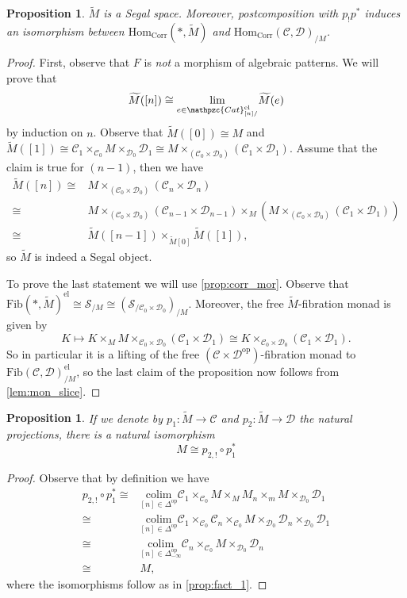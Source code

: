 \documentclass[a4paper, reqno]{amsart}
\newtheorem{prop}[theorem]{Proposition}
\theoremstyle{definition}
\newcommand\cC{\mathscr C}
\newcommand\cD{\mathscr D}
\newcommand\cS{\mathscr S}
\newcommand\mor{\mathrm{Hom}}
\newcommand\op{\mathrm{op}}
\newcommand\colim{\mathrm{colim}}
\newcommand\fib{\mathrm{Fib}}
\newcommand\el{\mathrm{el}}
\newcommand{\mElo}[2]{\mathpzc{#1}^{\mathrm{el}}_{#2/}}
\begin{document}
\begin{prop}\label{prop:rfib}
$\widetilde{M}$ is a Segal space. Moreover, postcomposition with $p_!p^*$ induces an isomorphism between $\mor_{\mathrm{Corr}}(*, \widetilde{M})$ and $\mor_{\mathrm{Corr}}(\cC, \cD)_{/M}$.
\end{prop}
\begin{proof}
First, observe that $F$ is \textit{not} a morphism of algebraic patterns. We will prove that 
\[\widetilde{M}([n])\cong\underset{e\in\mElo{Cat}{[n]}}{\lim}\widetilde{M}(e)\]
by induction on $n$. Observe that $\widetilde{M}([0])\cong M$ and $\widetilde{M}([1])\cong \cC_1\times_{\cC_0}M\times_{\cD_0}\cD_1\cong M\times_{(\cC_0\times \cD_0)}(\cC_1\times\cD_1)$. Assume that the claim is true for $(n-1)$, then we have 
\begin{equation*}
    \begin{split}
        \widetilde{M}([n])\cong& M\times_{(\cC_0\times\cD_0)}(\cC_n\times\cD_n)\\
        \cong&  M\times_{(\cC_0\times\cD_0)}(\cC_{n-1}\times\cD_{n-1})\times_M(M\times_{(\cC_0\times\cD_0)}(\cC_1\times\cD_1))\\
        \cong&\widetilde{M}([n-1])\times_{\widetilde{M}[0]}\widetilde{M}([1]),
    \end{split}
\end{equation*}
so $\widetilde{M}$ is indeed a Segal object.\par
To prove the last statement we will use \cref{prop:corr_mor}. Observe that $\fib(*,\widetilde{M})^\el\cong\cS_{/M}\cong (\cS_{/\cC_0\times \cD_0})_{/M}$. Moreover, the free $\widetilde{M}$-fibration monad is given by 
\[K\mapsto K\times_M M\times_{\cC_0\times \cD_0} (\cC_1\times \cD_1)\cong K\times_{\cC_0\times \cD_0} (\cC_1\times \cD_1).\] 
So in particular it is a lifting of the free $(\cC\times\cD^\op)$-fibration monad to $\fib(\cC,\cD)_{/M}^\el$, so the last claim of the proposition now follows from \cref{lem:mon_slice}.
\end{proof}
\begin{prop}
If we denote by $p_1:\widetilde{M}\rightarrow\cC$ and $p_2:\widetilde{M}\rightarrow\cD$ the natural projections, there is a natural isomorphism
\[M\cong p_{2,!}\circ p_1^*\]
\end{prop}
\begin{proof}
Observe that by definition we have
\begin{equation*}
    \begin{split}
        p_{2,!}\circ p_1^*\cong &\underset{[n]\in\Delta^\op}{\colim}\cC_1\times_{\cC_0} M\times_M M_n\times_m M\times_{\cD_0} \cD_1\\
        \cong &\underset{[n]\in\Delta^\op}{\colim} \cC_1\times_{\cC_0}\cC_n\times_{\cC_0}M\times_{\cD_0}\cD_n\times_{\cD_0}\cD_1\\
        \cong & \underset{[n]\in\Delta_{-\infty}^\op}{\colim}\cC_n\times_{\cC_0} M\times_{\cD_0}\cD_n\\
        \cong &M,
    \end{split}
\end{equation*}
where the isomorphisms follow as in \cref{prop:fact_1}.
\end{proof}
\end{document}
